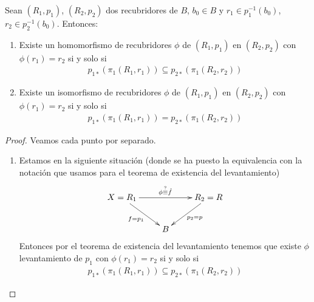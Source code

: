 \begin{coro}
    Sean $(R_1,p_1)$, $(R_2, p_2)$ dos recubridores de $B$, $b_0\in B$ y $r_1\in p_{1}^{-1}(b_0)$, $r_2\in p_2^{-1}(b_0)$. Entonces:
    \begin{enumerate}
        \item Existe un homomorfismo de recubridores $\phi$ de $(R_1,p_1)$ en $(R_2, p_2)$ con $\phi(r_1)=r_2$ si y solo si 
        \begin{gather*}
            p_{1*}(\pi_1(R_1,r_1)) \subseteq p_{2*}(\pi_1(R_2,r_2))
        \end{gather*}

        \item Existe un isomorfismo de recubridores $\phi$ de $(R_1,p_1)$ en $(R_2, p_2)$ con $\phi(r_1)=r_2$ si y solo si
        \begin{gather*}
            p_{1*}(\pi_1(R_1,r_1)) = p_{2*}(\pi_1(R_2,r_2))
        \end{gather*}
    \end{enumerate}

    \begin{proof}
        Veamos cada punto por separado.
        \begin{enumerate}
            \item Estamos en la siguiente situación (donde se ha puesto la equivalencia con la notación que usamos para el teorema de existencia del levantamiento)
            \begin{gather*}
                \xymatrix{
                    X = R_1 \ar[rr]^{\phi \overset{?}{\equiv} \hat{f}} \ar[dr]_{f=p_1} && R_2=R \ar[dl]^{p_2=p} \\
                    & B
                }
            \end{gather*}
            Entonces por el teorema de existencia del levantamiento tenemos que existe $\phi$ levantamiento de $p_1$ con $\phi(r_1) = r_2$ si y solo si 
            \begin{gather*}
                p_{1*}(\pi_1(R_1,r_1)) \subseteq p_{2*}(\pi_1(R_2,r_2))
            \end{gather*}


\end{enumerate}
\end{proof}
\end{coro}
